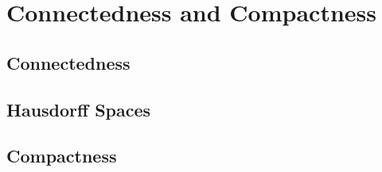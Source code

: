 \chapter{Connectedness and Compactness}

\section{Connectedness}













\section{Hausdorff Spaces}



\section{Compactness}









